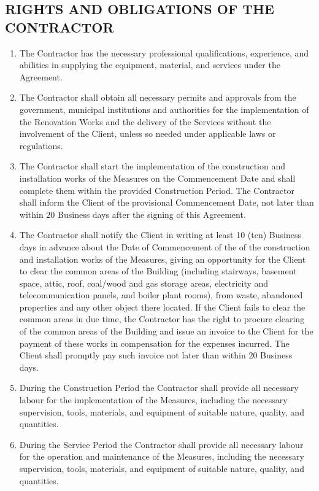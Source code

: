 \begin{multicols}{2}
\subsection{RIGHTS AND OBLIGATIONS OF THE CONTRACTOR}
\begin{enumerate}
	\item	The Contractor has the necessary professional qualifications, experience, and abilities in supplying the equipment, material, and services under the Agreement.
	\item	The Contractor shall obtain all necessary permits and approvals from the government, municipal institutions and authorities for the implementation of the Renovation Works and the delivery of the Services without the involvement of the Client, unless so needed under applicable laws or regulations.
	\item	The Contractor shall start the implementation of the construction and installation works of the Measures on the Commencement Date and shall complete them within the provided Construction Period. The Contractor shall inform the Client of the provisional Commencement Date, not later than within 20 Business days after the signing of this Agreement.
	\item	The Contractor shall notify the Client in writing at least 10 (ten) Business days in advance about the Date of Commencement of the of the construction and installation works of the Measures, giving an opportunity for the Client to clear the common areas of the Building (including stairways, basement space, attic, roof, coal/wood and gas storage areas, electricity and telecommunication panels, and boiler plant rooms), from waste, abandoned properties and any other object there located. If the Client fails to clear the common areas in due time, the Contractor has the right to procure clearing of the common areas of the Building and issue an invoice to the Client for the payment of these works in compensation for the expenses incurred. The Client shall promptly pay such invoice not later than within 20 Business days.
	\item	During the Construction Period the Contractor shall provide all necessary labour for the implementation of the Measures, including the necessary supervision, tools, materials, and equipment of suitable nature, quality, and quantities.
	\item	During the Service Period the Contractor shall provide all necessary labour for the operation and maintenance of the Measures, including the necessary supervision, tools, materials, and equipment of suitable nature, quality, and quantities.

\end{enumerate}
\end{multicols}
